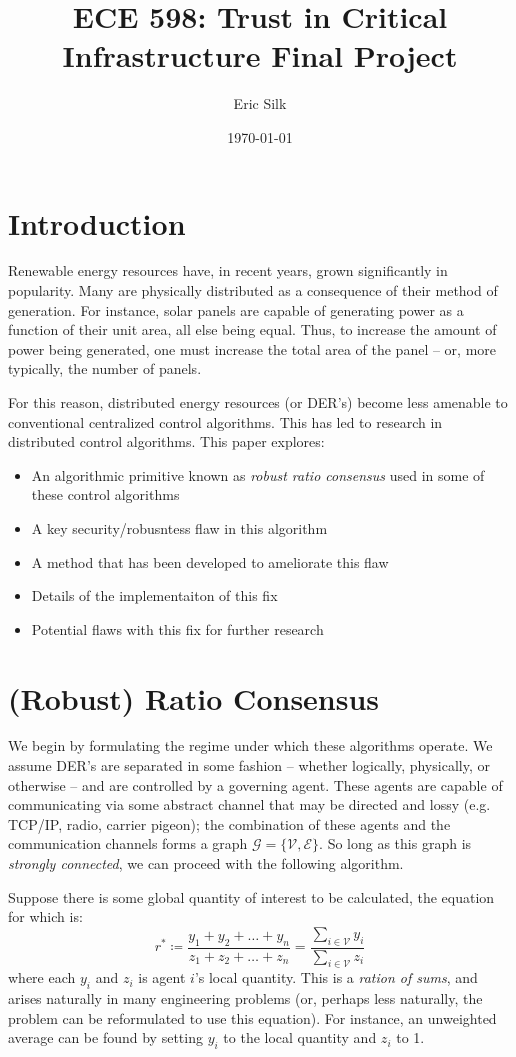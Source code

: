 \documentclass[11pt]{article}
\title{ECE 598: Trust in Critical Infrastructure Final Project}
\author{Eric Silk}
\date{\today}
\begin{document}
\maketitle
\pagebreak

\section{Introduction}
Renewable energy resources have, in recent years, grown significantly in
popularity. Many are physically distributed as a consequence of their method of
generation. For instance, solar panels are capable of generating power as a
function of their unit area, all else being equal.  Thus, to increase the amount
of power being generated, one must increase the total area of the panel -- or,
more typically, the number of panels.

For this reason, distributed energy resources (or DER's) become less amenable to
conventional centralized control algorithms. This has led to research in
distributed control algorithms. This paper explores:
\begin{itemize}
    \item An algorithmic primitive known as \textit{robust ratio consensus} used
          in some of these control algorithms
    \item A key security/robusntess flaw in this algorithm
    \item A method that has been developed to ameliorate this flaw
    \item Details of the implementaiton of this fix
    \item Potential flaws with this fix for further research
\end{itemize}
\section{(Robust) Ratio Consensus}
We begin by formulating the regime under which these algorithms operate. We
assume DER's are separated in some fashion -- whether logically, physically, or
otherwise -- and are controlled by a governing agent.  These agents are capable
of communicating via some abstract channel that may be directed and lossy (e.g.
TCP/IP, radio, carrier pigeon); the combination of these agents and the
communication channels forms a graph $\mathcal{G} = \{\mathcal{V},
    \mathcal{E}\}$.  So long as this graph is \textit{strongly connected}, we can
proceed with the following algorithm.

Suppose there is some global quantity of interest to be calculated, the equation
for which is:
\begin{equation}
    r^*
    \coloneqq \frac{y_1 + y_2 +\ldots + y_n}{z_1 + z_2 + \ldots + z_n}
    = \frac{\sum_{i\in\mathcal{V}}y_i}{\sum_{i\in\mathcal{V}}z_i}
\end{equation}
where each $y_i$ and $z_i$ is agent $i$'s local quantity.
This is a \textit{ration of sums}, and arises naturally in many engineering
problems (or, perhaps less naturally, the problem can be reformulated to use
this equation). For instance, an unweighted average can be found by setting
$y_i$ to the local quantity and $z_i$ to 1.
\end{document}
